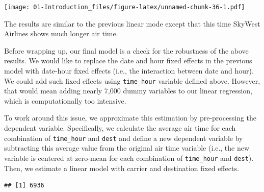 \documentclass[]{book}
\newenvironment{Shaded}{\begin{snugshade}}{\end{snugshade}}
\newcommand{\KeywordTok}[1]{\textcolor[rgb]{0.13,0.29,0.53}{\textbf{{#1}}}}
\newcommand{\StringTok}[1]{\textcolor[rgb]{0.31,0.60,0.02}{{#1}}}
\newcommand{\CommentTok}[1]{\textcolor[rgb]{0.56,0.35,0.01}{\textit{{#1}}}}
\newcommand{\NormalTok}[1]{{#1}}
\theoremstyle{definition}
\theoremstyle{definition}
\theoremstyle{remark}
\begin{document}
\texttt{[image: 01-Introduction\_files/figure-latex/unnamed-chunk-36-1.pdf]}

The results are similar to the previous linear mode except that this
time SkyWest Airlines shows much longer air time.

Before wrapping up, our final model is a check for the robustness of the
above results. We would like to replace the date and hour fixed effects
in the previous model with date-hour fixed effects (i.e., the
interaction between date and hour). We could add such fixed effects
using \texttt{time\_hour} variable defined above. However, that would
mean adding nearly 7,000 dummy variables to our linear regression, which
is computationally too intensive.

To work around this issue, we approximate this estimation by
pre-processing the dependent variable. Specifically, we calculate the
average air time for each combination of \texttt{time\_hour} and
\texttt{dest} and define a new dependent variable by subtracting this
average value from the original air time variable (i.e., the new
variable is centered at zero-mean for each combination of
\texttt{time\_hour} and \texttt{dest}). Then, we estimate a linear model
with carrier and destination fixed effects.

\begin{Shaded}
\end{Shaded}

\begin{verbatim}
## [1] 6936
\end{verbatim}
\end{document}
